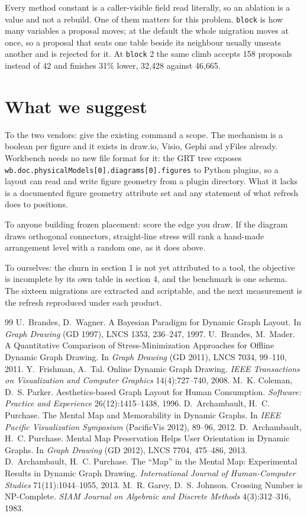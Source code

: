 \documentclass[11pt]{article}
\begin{document}
Every method constant is a caller-visible field read literally, so an ablation is a value
and not a rebuild. One of them matters for this problem. \texttt{block} is how many
variables a proposal moves; at the default the whole migration moves at once, so a proposal
that seats one table beside its neighbour usually unseats another and is rejected for it. At
\texttt{block} 2 the same climb accepts 158 proposals instead of 42 and finishes 31\% lower,
32{,}428 against 46{,}665.

\section{What we suggest}

To the two vendors: give the existing command a scope. The mechanism is a boolean per
figure and it exists in draw.io, Visio, Gephi and yFiles already. Workbench needs no new
file format for it: the GRT tree exposes
\texttt{wb.doc.physicalModels[0].diagrams[0].figures} to Python plugins, so a layout can
read and write figure geometry from a plugin directory. What it lacks is a documented
figure geometry attribute set and any statement of what refresh does to positions.

To anyone building frozen placement: score the edge you draw. If the diagram draws
orthogonal connectors, straight-line stress will rank a hand-made arrangement level with a
random one, as it does above.

To ourselves: the churn in section 1 is not yet attributed to a tool, the objective is
incomplete by its own table in section 4, and the benchmark is one schema. The sixteen
migrations are extracted and scriptable, and the next measurement is the refresh reproduced
under each product.

\begin{thebibliography}{99}
 U.~Brandes, D.~Wagner. A Bayesian Paradigm for Dynamic Graph Layout. In
 \emph{Graph Drawing} (GD 1997), LNCS 1353, 236--247, 1997.
 U.~Brandes, M.~Mader. A Quantitative Comparison of Stress-Minimization
 Approaches for Offline Dynamic Graph Drawing. In \emph{Graph Drawing} (GD 2011), LNCS
 7034, 99--110, 2011.
 Y.~Frishman, A.~Tal. Online Dynamic Graph Drawing. \emph{IEEE Transactions
 on Visualization and Computer Graphics} 14(4):727--740, 2008.
 M.~K. Coleman, D.~S. Parker. Aesthetics-based Graph Layout for Human
 Consumption. \emph{Software: Practice and Experience} 26(12):1415--1438, 1996.
 D.~Archambault, H.~C. Purchase. The Mental Map and Memorability in Dynamic
 Graphs. In \emph{IEEE Pacific Visualization Symposium} (PacificVis 2012), 89--96, 2012.
 D.~Archambault, H.~C. Purchase. Mental Map Preservation Helps User
 Orientation in Dynamic Graphs. In \emph{Graph Drawing} (GD 2012), LNCS 7704, 475--486,
 2013.
 D.~Archambault, H.~C. Purchase. The ``Map'' in the Mental Map: Experimental
 Results in Dynamic Graph Drawing. \emph{International Journal of Human-Computer Studies}
 71(11):1044--1055, 2013.
 M.~R. Garey, D.~S. Johnson. Crossing Number is NP-Complete. \emph{SIAM
 Journal on Algebraic and Discrete Methods} 4(3):312--316, 1983.
\end{thebibliography}
\end{document}
